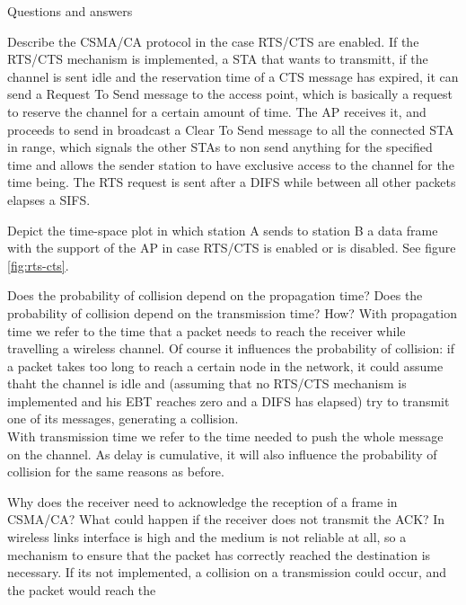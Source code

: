 \begin{section}{Questions and answers}
  \begin{subsubsection}{Describe the CSMA/CA protocol in the case RTS/CTS are enabled.}
    If the RTS/CTS mechanism is implemented, a STA that wants to transmitt, if the channel is sent
    idle and the reservation time of a CTS message has expired, it can send a Request To Send
    message to the access point, which is basically a request to reserve the channel for a certain
    amount of time. The AP receives it, and proceeds to send in broadcast a Clear To Send message to
    all the connected STA in range, which signals the other STAs to non send anything for the
    specified time and allows the sender station to have exclusive access to the channel for the
    time being. The RTS request is sent after a DIFS while between all other packets elapses a SIFS.
  \end{subsubsection}
  \begin{subsubsection}{Depict the time-space plot in which station A sends to station B a data
    frame with the support of the AP in case RTS/CTS is enabled or is disabled.}
    See figure \ref{fig:rts-cts}.
  \end{subsubsection}
  \begin{subsubsection}{Does the probability of collision depend on the propagation time? Does the
    probability of collision depend on the transmission time? How?}
    With propagation time we refer to the time that a packet needs to reach the receiver while
    travelling a wireless channel. Of course it influences the probability of collision: if a packet
    takes too long to reach a certain node in the network, it could assume thaht the channel is idle
    and (assuming that no RTS/CTS mechanism is implemented and his EBT reaches zero and a DIFS has
    elapsed) try to transmit one of its messages, generating a collision.\\
    With transmission time we refer to the time needed to push the whole message on the channel. As
    delay is cumulative, it will also influence the probability of collision for the same reasons as
    before.
  \end{subsubsection}
  \begin{subsubsection}{Why does the receiver need to acknowledge the reception of a frame in
    CSMA/CA? What could happen if the receiver does not transmit the ACK?}
    In wireless links interface is high and the medium is not reliable at all, so a mechanism to
    ensure that the packet has correctly reached the destination is necessary. If its not
    implemented, a collision on a transmission could occur, and the packet would reach the

\end{subsubsection}
\end{section}
